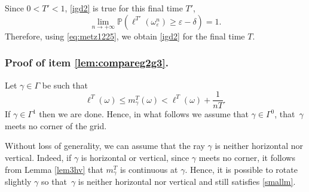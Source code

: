 \documentclass[JEP,XML,SOM,Unicode, NoEqCountersInSection,NoFloatCountersInSection,published]{cedram}
\theoremstyle{definition}
\begin{document}
Since $0<T'<1$, \eqref{igd2} is true for this final time $T'$, \ie
\[
\displaystyle\lim_{n\to +\infty} \mathbb{P}\left( \ell^{T'}(\omega_\varepsilon^n) \geq \varepsilon - \delta \right) = 1.
\]
Therefore, using \eqref{eq:metz1225}, we obtain \eqref{igd2} for the final time $T$.


\subsubsection*{Proof of item \eqref{lem:compareg2g3}.}
Let $\gamma\in\Gamma$ be such that
\begin{equation} \label{smallm}
\ell^T(\omega)\leq m^T_\gamma(\omega) < \ell^T(\omega) + \frac{1}{nT}.
\end{equation}
If $\gamma\in\Gamma^1$ then we are done. Hence, in what follows we assume that $\gamma\in\Gamma^0$, \ie that~$\gamma$ meets no corner of the grid.

Without loss of generality, we can assume that the ray $\gamma$ is neither horizontal nor vertical. Indeed, if $\gamma$ is horizontal or vertical, since $\gamma$ meets no corner, it follows from Lemma \ref{lem3hv} that $m^T_\gamma$ is continuous at $\gamma$. Hence, it is possible to rotate slightly $\gamma$ so that~$\gamma$ is neither horizontal nor vertical and still satisfies \eqref{smallm}.
\end{document}
